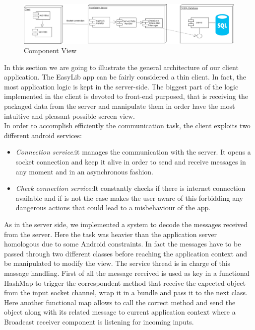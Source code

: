 \vspace*{0cm}
\begin{figure}[H]
	\centering
	\includegraphics[scale=0.35]{Images/Diagrams/Component_diagram}
	\caption{Component View}
\end{figure}

In this section we are going to illustrate the general architecture of our client application. The EasyLib app can be fairly considered a thin client. In fact, the most application logic is kept in the server-side. The biggest part of the logic implemented in the client is devoted to front-end purposed, that is receiving the packaged data from the server and manipulate them in order have the most intuitive and pleasant possible screen view.\\ 
In order to accomplish efficiently the communication task, the client exploits two different android services: 

\begin{itemize}
\item \emph{Connection service:}it manages the communication with the server. It opens a socket connection and keep it alive in order to send and receive messages in any moment and in an asynchronous fashion.
\item \emph{Check connection service:}It constantly checks if there is internet connection available and if is not the case makes the user aware of this forbidding any dangerous actions that could lead to a misbehaviour of the app.
\end{itemize}

As in the server side, we implemented a system to decode the messages received from the server. Here the task was heavier than the application server homologous due to some Android constraints. In fact the messages have to be passed through two different classes before reaching the application context and be manipulated to modify the view. The service thread is in charge of this massage handling. First of all the message received is used as key in a functional HashMap to trigger the correspondent method that receive the expected object from the input socket channel, wrap it in a bundle and pass it to the next class. Here another functional map allows to call the correct method and send the object along with its related message to current application context where a Broadcast receiver component is listening for incoming inputs.

